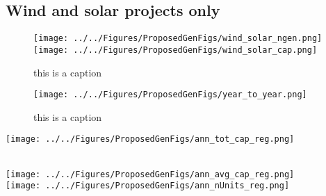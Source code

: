 \documentclass[11pt, oneside]{article}   	%
\begin{document}
\subsection{Wind and solar projects only}
\begin{figure}[ht]
\caption{this is a caption}
\texttt{[image: ../../Figures/ProposedGenFigs/wind\_solar\_ngen.png]}
\texttt{[image: ../../Figures/ProposedGenFigs/wind\_solar\_cap.png]}
\end{figure}

\begin{figure}
\caption{this is a caption}
\texttt{[image: ../../Figures/ProposedGenFigs/year\_to\_year.png]}
\end{figure}










\texttt{[image: ../../Figures/ProposedGenFigs/ann\_tot\_cap\_reg.png]}

\\
\texttt{[image: ../../Figures/ProposedGenFigs/ann\_avg\_cap\_reg.png]}
\\
\texttt{[image: ../../Figures/ProposedGenFigs/ann\_nUnits\_reg.png]}
\end{document}
